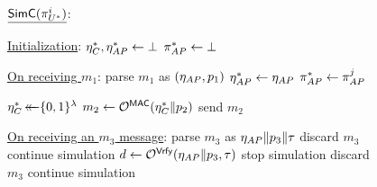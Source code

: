 \begin{figure}

\small

\begin{adjustbox}{margin*=2ex,width=0.997\textwidth,frame,center}
	\begin{minipage}[t]{0.53\textwidth}
			$\underline{\simC(\eatarget)}$: 
			\begin{algorithmic}[1]
				
				\Statex
			
				\Statex \underline{Initialization}:
				\setcounter{ALG@line}{100}
				\Indent
					\State $\eta_{C}^*, \eta_{AP}^* \gets \bot$
					\State $\oracle[AP][*] \gets \bot$
				\EndIndent
				
				\Statex
				
				\Statex \underline{On receiving $m_1$}:\label{code:simC:line:m_1_start}
				\setcounter{ALG@line}{200} 
				\Indent
					\State parse $m_1$ as $(\eta_{AP}, p_1)$
					\State $\eta_{AP}^* \gets \eta_{AP}$
						\State $\oracle[AP][*] \gets \oracle[AP][j]$
					\EndIf
					
					\State $\eta_{C}^* \operatorname{\leftarrow\mathrel{\mkern-14mu}\leftarrow} \lbrace 0, 1 \rbrace^\lambda$
					\State $m_2 \gets \mathcal{O}^{\mathsf{MAC}}(\eta_{C}^* \| p_2)$
					\State send $m_2$ \label{code:simC:line:m_1_end}

				\EndIndent
		
				\Statex
				
				\Statex \underline{On receiving an $m_3$ message}: \label{code:simC:line:m_3_start}
				\setcounter{ALG@line}{300} 
				\Indent
					\State parse $m_3$ as $\eta_{AP} \| p_3 \| \tau$
						\State discard $m_3$
						\State continue simulation
					\Else
						\State $d \gets \mathcal{O}^{\mathsf{Vrfy}}(\eta_{AP} \| p_3, \tau)$ \label{code:simC:line:verify_m_3}
							\State stop simulation \label{code:simC:line:verify_m_3:win}
						\Else
							\State discard $m_3$
							\State continue simulation \label{code:simC:line:m_3_end}
						\EndIf
					\EndIf
				\EndIndent
	
				\Statex
				

\end{algorithmic}
\end{minipage}
\end{adjustbox}
\end{figure}
